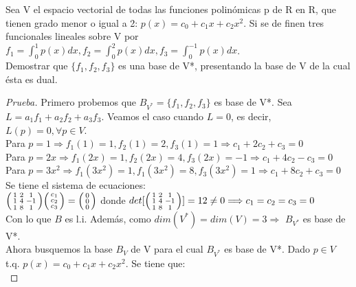 \documentclass[12pt]{article}
\newenvironment{problem}[2][Problem]{\begin{trivlist}
\item[\hskip \labelsep {\bfseries #1}\hskip \labelsep {\bfseries #2.}]}{\end{trivlist}}
\newenvironment{xmat}
  {\left(\begin{smallmatrix}}
  {\end{smallmatrix}\right)}
\begin{document}
\begin{problem}[Problema]{5}
Sea V el espacio vectorial de todas las funciones polinómicas p de R en R, que tienen grado menor o igual a 2:  $p(x)= c_{0}+c_{1}x+c_{2}x^{2}$. Si se de finen tres funcionales lineales sobre V por $f_{1}=\int_{0}^{1}p(x)dx, f_{2}=\int_{0}^{2}p(x)dx, f_{3}=\int_{0}^{-1}p(x)dx$. \\
Demostrar que $\{f_{1}, f_{2}, f_{3}\}$ es una base de V*, presentando la base de V de la cual ésta es dual.
\end{problem}

\begin{proof} [Prueba]
Primero probemos que $B_{V^{*}}=\{f_{1}, f_{2}, f_{3}\}$ es base de V*. Sea $L=a_{1}f_{1}+a_{2}f_{2}+a_{3}f_{3}$. Veamos el caso cuando $L=0$, es decir, $L(p)=0, \forall p \in V$.\\
Para $p=1 \Longrightarrow f_{1}(1)=1, f_{2}(1)=2, f_{3}(1)=1 \Longrightarrow c_{1}+2c_{2}+c_{3}=0$\\
Para $p=2x \Longrightarrow f_{1}(2x)=1, f_{2}(2x)=4, f_{3}(2x)=-1 \Longrightarrow c_{1}+4c_{2}-c_{3}=0$\\
Para $p=3x^{2} \Longrightarrow f_{1}(3x^{2})=1, f_{1}(3x^{2})=8, f_{3}(3x^{2})=1 \Longrightarrow c_{1}+8c_{2}+c_{3}=0$\\
Se tiene el sistema de ecuaciones:\\
$\begin{xmat}1 & 2 & 1\\1 & 4 & -1 \\ 1 & 8 & 1\end{xmat}
\begin{xmat}c_{1}\\c_{2} \\ c_{3}\end{xmat}=
\begin{xmat}0\\0 \\ 0\end{xmat}$ donde $det[\begin{xmat}1 & 2 & 1\\1 & 4 & -1 \\ 1 & 8 & 1\end{xmat}]=12 \neq 0 \Longrightarrow c_{1}=c_{2}=c_{3}=0$\\
Con lo que $B$ es l.i. Además, como $dim(V^{*})=dim(V)=3 \Longrightarrow$ $B_{V^{*}}$ es base de V*. \\

Ahora busquemos la base $B_{V}$ de V para el cual $B_{V^{*}}$ es base de V*. 
Dado $p \in V$ t.q. $p(x) = c_{0}+c_{1}x+c_{2}x^{2}$. Se tiene que:\\


\end{proof}
\end{document}
